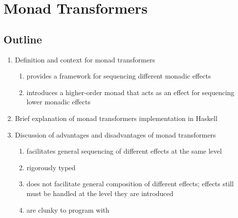 \chapter{Monad Transformers}

\section{Outline}
\begin{enumerate}
  \item Definition and context for monad transformers
  \begin{enumerate}
    \item provides a framework for sequencing different monadic effects
    \item introduces a higher-order monad that acts as an effect for sequencing lower monadic effects
  \end{enumerate}
  \item Brief explanation of monad transformers implementation in Haskell
  \item Discussion of advantages and disadvantages of monad transformers
  \begin{enumerate}
    \item facilitates general sequencing of different effects at the same level
    \item rigorously typed
    \item does not facilitate general composition of different effects; effects still must be handled at the level they are introduced
    \item are clunky to program with
  \end{enumerate}
\end{enumerate}
